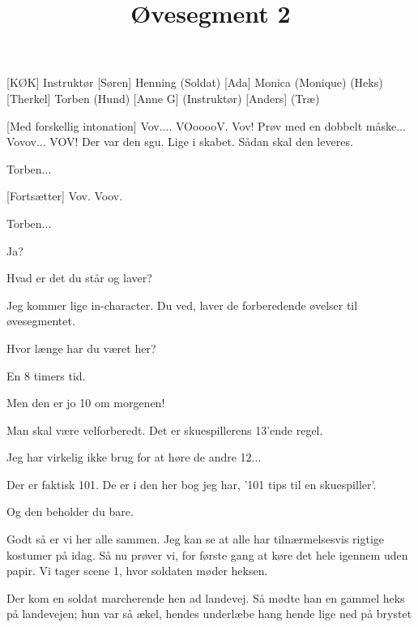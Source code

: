 \documentclass[a4paper,11pt]{article}
\title{Øvesegment 2}
\author{}
\begin{document}
\maketitle

\begin{roles}
[KØK] Instruktør
[Søren] Henning (Soldat)
[Ada] Monica (Monique) (Heks)
[Therkel] Torben (Hund)
[Anne G] (Instruktør)
[Anders] (Træ)
\end{roles}

\begin{sketch}

[Med forskellig intonation] Vov.... VOooooV. Vov! Prøv med en dobbelt måske... Vovov... VOV! Der var den sgu. Lige i skabet. Sådan skal den leveres.


 Torben...

[Fortsætter] Vov. Voov.

 Torben...

 Ja? 

 Hvad er det du står og laver?

 Jeg kommer lige in-character. Du ved, laver de forberedende øvelser til øvesegmentet.

 Hvor længe har du været her?

 En 8 timers tid. 

 Men den er jo 10 om morgenen!

 Man skal være velforberedt. Det er skuespillerens 13'ende regel. 

 Jeg har virkelig ikke brug for at høre de andre 12...

 Der er faktisk 101. De er i den her bog jeg har, '101 tips til en skuespiller'. 

 Og den beholder du bare.


 Godt så er vi her alle sammen. Jeg kan se at alle har tilnærmelsesvis rigtige kostumer på idag. Så nu prøver vi, for første gang at køre det hele igennem uden papir. Vi tager scene 1, hvor soldaten møder heksen. 


 Der kom en soldat marcherende hen ad landevej. Så mødte han en gammel heks på landevejen; hun var så ækel, hendes underlæbe hang hende lige ned på brystet


\end{sketch}
\end{document}
